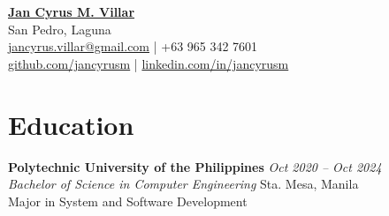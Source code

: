 \documentclass[a4paper, 10pt]{article}
\begin{document}

\begin{center}
  \href{https://jancyrusm.github.io}{\textbf{\Large Jan Cyrus M. Villar}} \\[-0.1em]
  San Pedro, Laguna \\[-0.1em]
  \href{mailto:jancyrus.villar@gmail.com}{jancyrus.villar@gmail.com} | +63 965 342 7601\\[-0.1em]
  \href{https://github.com/jancyrusm}{github.com/jancyrusm} | \href{https://linkedin.com/in/jancyrusm}{linkedin.com/in/jancyrusm}
\end{center}

\vspace{-1.5em}

\section*{Education}
\noindent \textbf{Polytechnic University of the Philippines} \hfill \textit{Oct 2020 – Oct 2024} \\
\textit{Bachelor of Science in Computer Engineering} \hfill Sta. Mesa, Manila \\
Major in System and Software Development

\vspace{-1.5em}
\end{document}
